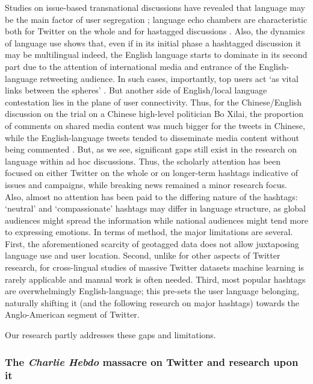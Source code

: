 Studies on issue-based transnational discussions have revealed that language may be the main factor of user segregation \cite{ChenTuZheng}; language echo chambers are characteristic both for Twitter on the whole and for hastagged discussions \cite{BastosPuschmannTravitzki}. Also, the dynamics of language use shows that, even if in its initial phase a hashtagged discussion it may be multilingual indeed, the English language starts to dominate in its second part due to the attention of international media and entrance of the English-language retweeting audience. In such cases, importantly, top users act ‘as vital links between the spheres’ \cite[p.~21]{PoellDarmoni}. But another side of English/local language contestation lies in the plane of user connectivity. Thus, for the Chinese/English discussion on the trial on a Chinese high-level politician Bo Xilai, the proportion of comments on shared media content was much bigger for the tweets in Chinese, while the English-language tweets tended to disseminate media content without being commented \cite{MenchenTrevinoMao}
.
But, as we see, significant gaps still exist in the research on language within ad hoc discussions. Thus, the scholarly attention has been focused on either Twitter on the whole or on longer-term hashtags indicative of issues and campaigns, while breaking news remained a minor research focus. Also, almost no attention has been paid to the differing nature of the hashtags: ‘neutral’ and ‘compassionate’ hashtags may differ in language structure, as global audiences might spread the information while national audiences might tend more to expressing emotions. In terms of method, the major limitations are several. First, the aforementioned scarcity of geotagged data does not allow juxtaposing language use and user location. Second, unlike for other aspects of Twitter research, for cross-lingual studies of massive Twitter datasets machine learning is rarely applicable and manual work is often needed. Third, most popular hashtags are overwhelmingly English-language; this pre-sets the user language belonging, naturally shifting it (and the following research on major hashtags) towards the Anglo-American segment of Twitter.

Our research partly addresses these gaps and limitations.

\subsubsection{The \textit{Charlie Hebdo} massacre on Twitter and research upon it}

